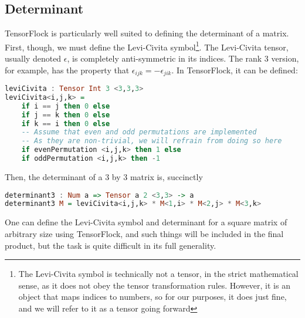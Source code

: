 \documentclass[12pt]{article}
\begin{document}
\subsection{Determinant}
TensorFlock is particularly well suited to defining the determinant of a matrix. First, though, we must define the Levi-Civita symbol\footnote{The Levi-Civita symbol is technically not a tensor, in the strict mathematical sense, as it does not obey the tensor transformation rules. However, it is an object that maps indices to numbers, so for our purposes, it does just fine, and we will refer to it as a tensor going forward}.
 The Levi-Civita tensor, usually denoted $\epsilon$, is completely anti-symmetric in its indices. The rank 3 version, for example, has the property that 
$\epsilon_{ijk} = -\epsilon_{jik}$. In TensorFlock, it can be defined:
\begin{lstlisting}[language=Haskell]
leviCivita : Tensor Int 3 <3,3,3>
leviCivita<i,j,k> = 
	if i == j then 0 else
	if j == k then 0 else
	if k == i then 0 else
	-- Assume that even and odd permutations are implemented
	-- As they are non-trivial, we will refrain from doing so here
	if evenPermutation <i,j,k> then 1 else
	if oddPermutation <i,j,k> then -1
\end{lstlisting}
Then, the determinant of a 3 by 3 matrix is, succinctly
\begin{lstlisting}[language=Haskell]
determinant3 : Num a => Tensor a 2 <3,3> -> a
determinant3 M = leviCivita<i,j,k> * M<1,i> * M<2,j> * M<3,k>
\end{lstlisting}
One can define the Levi-Civita symbol and determinant for a square matrix of arbitrary size using TensorFlock, and such things will be included in the final product, but the task is quite difficult in its full generality.
\end{document}
